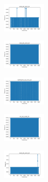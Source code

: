 \begin{figure}[H]
\begin{subfigure}
    \end{subfigure}
    \hfill
    \begin{subfigure}
        \centering
        \includegraphics[width=0.234\textwidth]{img/ageun/ecoli_set_const_20_589741062_time.png}
    \end{subfigure}
    \hfill
    \begin{subfigure}
        \centering
        \includegraphics[width=0.234\textwidth]{img/ageun/rand_set_const_20_589741062_time.png}
    \end{subfigure}
    \hfill
    \begin{subfigure}
        \centering
        \includegraphics[width=0.234\textwidth]{img/ageun/newthyroid_set_const_20_589741062_time.png}
    \end{subfigure}
    \hfill
    \begin{subfigure}
        \centering
        \includegraphics[width=0.234\textwidth]{img/ageun/iris_set_const_20_277451237_time.png}
    \end{subfigure}
    \hfill
    \begin{subfigure}
        \centering
        \includegraphics[width=0.234\textwidth]{img/ageun/ecoli_set_const_20_277451237_time.png}
    \end{subfigure}
    \hfill

\end{figure}
